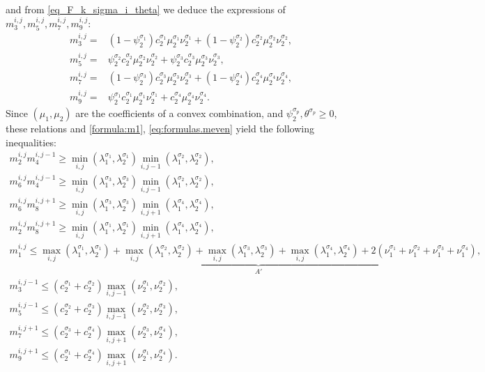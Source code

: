 \documentclass[final,11pt]{elsarticle}
\begin{document}
and from \eqref{eq_F_k_sigma_i_theta} we deduce the expressions of $m_3^{i,j},m_5^{i,j},m_7^{i,j},m_9^{i,j}$:
\[
\begin{aligned}
m_3^{i,j}={}&(1-\psi_2^{\sigma_1}) c_2^{\sigma_1}\mu_2^{\sigma_1}\nu_{2}^{\sigma_1}+(1-\psi_2^{\sigma_2})c_2^{\sigma_2}\mu_2^{\sigma_2}\nu_{2}^{\sigma_2},\\
m_5^{i,j}={}&\psi_2^{\sigma_2}c_2^{\sigma_2}\mu_2^{\sigma_2}\nu_{2}^{\sigma_2}+\psi_2^{\sigma_3}c_2^{\sigma_3}\mu_2^{\sigma_3}\nu_{2}^{\sigma_3},\\
m_7^{i,j}={}&(1-\psi_2^{\sigma_3})c_2^{\sigma_3}\mu_2^{\sigma_3}\nu_{2}^{\sigma_3}+(1-\psi_2^{\sigma_4})c_2^{\sigma_4}\mu_2^{\sigma_4}\nu_{2}^{\sigma_4},\\
m_9^{i,j}={}&\psi_2^{\sigma_1} c_2^{\sigma_1}\mu_2^{\sigma_1}\nu_{2}^{\sigma_1}+c_2^{\sigma_4}\mu_2^{\sigma_4}\nu_{2}^{\sigma_4}.
\end{aligned}
\]
Since $(\mu_1,\mu_2)$ are the coefficients of a convex combination, and $\psi_2^{\sigma_p},\theta^{\sigma_p}\geq 0$, these relations and \eqref{formula:m1}, \eqref{eq:formulas.meven} yield the following inequalities:
\begin{equation}
\begin{gathered}
m_{2}^{i, j} m_{4}^{i, j-1}\geq \min_{i,j}(\lambda_1^{\sigma_1},\lambda_2^{\sigma_1})\min_{i, j-1}(\lambda_1^{\sigma_2},\lambda_2^{\sigma_2}),\\
m_{6}^{i, j} m_{4}^{i, j-1}\geq \min_{i,j}(\lambda_1^{\sigma_3},\lambda_2^{\sigma_3})\min_{i, j-1}(\lambda_1^{\sigma_2},\lambda_2^{\sigma_2}),\\
m_{6}^{i, j} m_{8}^{i, j+1}\geq \min_{i,j}(\lambda_1^{\sigma_3},\lambda_2^{\sigma_3})\min_{i, j+1}(\lambda_1^{\sigma_4},\lambda_2^{\sigma_4}),\\
m_{2}^{i, j} m_{8}^{i, j+1}\geq \min_{i,j}(\lambda_1^{\sigma_1},\lambda_2^{\sigma_1})\min_{i, j+1}(\lambda_1^{\sigma_4},\lambda_2^{\sigma_4}),\\
m_1^{i,j}\leq\underbrace{\max_{i,j}(\lambda_1^{\sigma_1},\lambda_2^{\sigma_1})+\max_{i,j}(\lambda_1^{\sigma_2},\lambda_2^{\sigma_2})+\max_{i,j}(\lambda_1^{\sigma_3},\lambda_2^{\sigma_3})+\max_{i,j}(\lambda_1^{\sigma_4},\lambda_2^{\sigma_4})+2(\nu_1^{\sigma_1}+\nu_1^{\sigma_2}+\nu_1^{\sigma_3}+\nu_1^{\sigma_4})}_{A'},\\
m_3^{i,j-1}\leq (c_2^{\sigma_1}+c_2^{\sigma_2})\max_{i,j-1}(\nu_{2}^{\sigma_1},\nu_{2}^{\sigma_2}),\\
m_5^{i,j-1}\leq(c_{2}^{\sigma_2}+c_{2}^{\sigma_3})\max_{i,j-1}(\nu_{2}^{\sigma_2},\nu_{2}^{\sigma_3}),\\
m_7^{i,j+1}\leq (c_2^{\sigma_3}+c_2^{\sigma_4})\max_{i,j+1}(\nu_{2}^{\sigma_3},\nu_{2}^{\sigma_4}),\\
m_9^{i,j+1}\leq(c_{2}^{\sigma_1}+c_{2}^{\sigma_4})\max_{i,j+1}(\nu_{2}^{\sigma_1},\nu_{2}^{\sigma_4}).
\end{gathered}
\end{equation}
\end{document}
